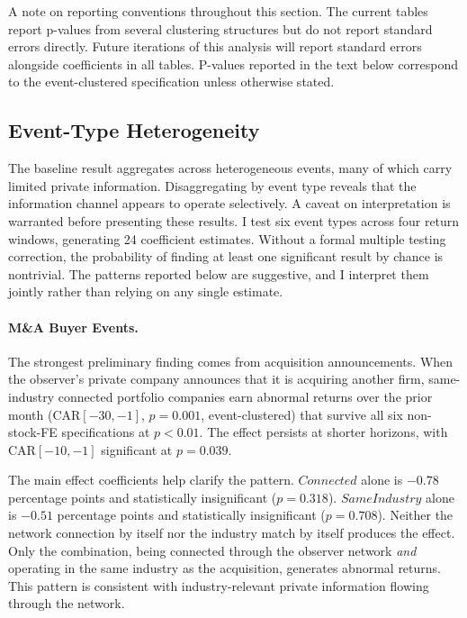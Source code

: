A note on reporting conventions throughout this section. The current tables report p-values from several clustering structures but do not report standard errors directly. Future iterations of this analysis will report standard errors alongside coefficients in all tables. P-values reported in the text below correspond to the event-clustered specification unless otherwise stated.

\subsection{Event-Type Heterogeneity}



The baseline result aggregates across heterogeneous events, many of which carry limited private information. Disaggregating by event type reveals that the information channel appears to operate selectively. A caveat on interpretation is warranted before presenting these results. I test six event types across four return windows, generating 24 coefficient estimates. Without a formal multiple testing correction, the probability of finding at least one significant result by chance is nontrivial. The patterns reported below are suggestive, and I interpret them jointly rather than relying on any single estimate.

\paragraph{M\&A Buyer Events.} The strongest preliminary finding comes from acquisition announcements. When the observer's private company announces that it is acquiring another firm, same-industry connected portfolio companies earn abnormal returns over the prior month (CAR$[-30,-1]$, $p=0.001$, event-clustered) that survive all six non-stock-FE specifications at $p<0.01$. The effect persists at shorter horizons, with CAR$[-10,-1]$ significant at $p=0.039$.

The main effect coefficients help clarify the pattern. $Connected$ alone is $-0.78$ percentage points and statistically insignificant ($p=0.318$). $SameIndustry$ alone is $-0.51$ percentage points and statistically insignificant ($p=0.708$). Neither the network connection by itself nor the industry match by itself produces the effect. Only the combination, being connected through the observer network \textit{and} operating in the same industry as the acquisition, generates abnormal returns. This pattern is consistent with industry-relevant private information flowing through the network.


